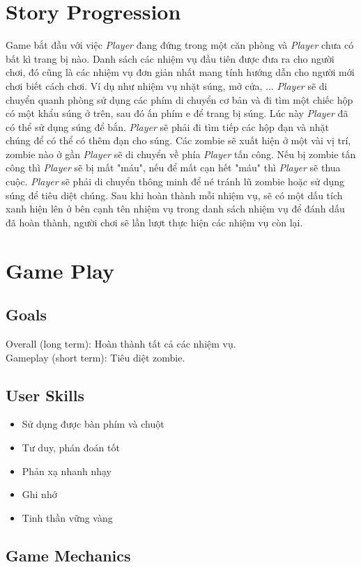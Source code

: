 \documentclass[14pt,a4paper]{extreport}
\begin{document}
\chapter{Story Progression}
Game bắt đầu với việc \textit{Player} đang đứng trong một căn phòng và \textit{Player} chưa có bất kì trang bị nào. Danh sách các nhiệm vụ đầu tiên được đưa ra cho người chơi, đó cũng là các nhiệm vụ đơn giản nhất mang tính hướng dẫn cho người mới chơi biết cách chơi. Ví dụ như nhiệm vụ nhặt súng, mở cửa, ... \textit{Player} sẽ di chuyển quanh phòng sử dụng các phím di chuyển cơ bản và đi tìm một chiếc hộp có một khẩu súng ở trên, sau đó ấn phím e để trang bị súng. Lúc này \textit{Player} đã có thể sử dụng súng để bắn. \textit{Player} sẽ phải đi tìm tiếp các hộp đạn và nhặt chúng để có thể có thêm đạn cho súng. Các zombie sẽ xuất hiện ở một vài vị trí, zombie nào ở gần \textit{Player} sẽ di chuyển về phía \textit{Player} tấn công. Nếu bị zombie tấn công thì \textit{Player} sẽ bị mất "máu", nếu để mất cạn hết "máu" thì \textit{Player} sẽ thua cuộc. \textit{Player} sẽ phải di chuyển thông minh để né tránh lũ zombie hoặc sử dụng súng để tiêu diệt chúng. Sau khi hoàn thành mỗi nhiệm vụ, sẽ có một dấu tích xanh hiện lên ở bên cạnh tên nhiệm vụ trong danh sách nhiệm vụ để đánh dấu đã hoàn thành, người chơi sẽ lần lượt thực hiện các nhiệm vụ còn lại.

\chapter{Game Play}
\section{Goals}
Overall (long term): Hoàn thành tất cả các nhiệm vụ. \\
Gameplay (short term): Tiêu diệt zombie.

\section{User Skills}
\begin{itemize}
	\item Sử dụng được bàn phím và chuột
	\item Tư duy, phán đoán tốt
	\item Phản xạ nhanh nhạy
	\item Ghi nhớ
	\item Tinh thần vững vàng
\end{itemize}


\section{Game Mechanics}
\end{document}
